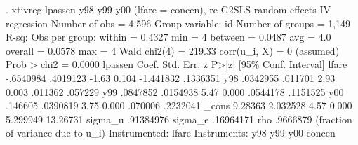 . xtivreg lpassen y98 y99 y00 (lfare = concen), re
{\smallskip}
G2SLS random-effects IV regression              Number of obs     =      4,596
Group variable: id                              Number of groups  =      1,149
{\smallskip}
R-sq:                                           Obs per group:
     within  = 0.4327                                         min =          4
     between = 0.0487                                         avg =        4.0
     overall = 0.0578                                         max =          4
{\smallskip}
                                                Wald chi2(4)      =     219.33
corr(u_i, X)       = 0 (assumed)                Prob > chi2       =     0.0000
{\smallskip}
     lpassen {\VBAR}      Coef.   Std. Err.      z    P>|z|     [95\% Conf. Interval]
       lfare {\VBAR}  -.6540984   .4019123    -1.63   0.104    -1.441832    .1336351
         y98 {\VBAR}   .0342955    .011701     2.93   0.003      .011362     .057229
         y99 {\VBAR}   .0847852   .0154938     5.47   0.000     .0544178    .1151525
         y00 {\VBAR}    .146605   .0390819     3.75   0.000      .070006    .2232041
       _cons {\VBAR}    9.28363   2.032528     4.57   0.000     5.299949    13.26731
     sigma_u {\VBAR}  .91384976
     sigma_e {\VBAR}  .16964171
         rho {\VBAR}   .9666879   (fraction of variance due to u_i)
Instrumented:   lfare
Instruments:    y98 y99 y00 concen
{\smallskip}
